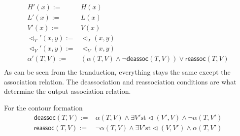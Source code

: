 \documentclass{article}
\begin{document}
\begin{align*}
	H'(x) := & H(x)\\
	L'(x) := & L(x)\\
	V'(x) := & V(x)\\
	\lhd_T'(x,y) := & \lhd_T(x,y) \\
	\lhd_V'(x,y) := & \lhd_V(x,y) \\
	\alpha'(T,V) := & (\alpha(T,V) \land \neg \textsf{deassoc}(T,V)) \lor \textsf{reassoc}(T,V) \\		
\end{align*}
As can be seen from the tranduction, everything stays the same except the 
association relation. The deassociation and reassociation conditions are 
what determine the output association relation.

For the contour formation
\begin{align*}
	\textsf{deassoc}(T,V) := & \alpha (T,V) \land  \exists V' \text{st} \lhd(V',V) \land \neg \alpha (T,V') \\
	\textsf{reassoc}(T,V) := & \neg \alpha (T,V) \land  \exists V' \text{st} \lhd(V,V') \land \alpha (T,V') \\
\end{align*}



\end{document}
